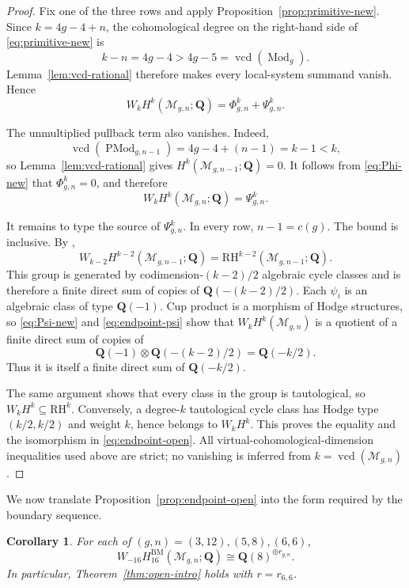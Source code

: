 \documentclass[12pt,reqno]{amsart}
\newcommand{\Q}{\mathbf{Q}}
\newcommand{\M}{\mathcal{M}}
\newcommand{\BM}{\mathrm{BM}}
\newcommand{\RH}{\mathrm{RH}}
\newcommand{\Mod}{\operatorname{Mod}}
\newcommand{\PMod}{\operatorname{PMod}}
\newcommand{\vcd}{\operatorname{vcd}}
\newtheorem{corollary}[theorem]{Corollary}
\theoremstyle{definition}
\theoremstyle{remark}
\begin{document}
\begin{proof}
Fix one of the three rows and apply
Proposition~\ref{prop:primitive-new}.  Since $k=4g-4+n$, the cohomological
degree on the right-hand side of \eqref{eq:primitive-new} is
\[
  k-n=4g-4>4g-5=\vcd(\Mod_g).
\]
Lemma~\ref{lem:vcd-rational} therefore makes every local-system summand
vanish.  Hence
\begin{equation}\label{eq:endpoint-phipsi}
  W_kH^k(\M_{g,n};\Q)=\Phi^k_{g,n}+\Psi^k_{g,n}.
\end{equation}

The unmultiplied pullback term also vanishes.  Indeed,
\[
 \vcd(\PMod_{g,n-1})
   =4g-4+(n-1)=k-1<k,
\]
so Lemma~\ref{lem:vcd-rational} gives
$H^k(\M_{g,n-1};\Q)=0$.  It follows from
\eqref{eq:Phi-new} that $\Phi^k_{g,n}=0$, and therefore
\begin{equation}\label{eq:endpoint-psi}
  W_kH^k(\M_{g,n};\Q)=\Psi^k_{g,n}.
\end{equation}

It remains to type the source of $\Psi^k_{g,n}$.  In every row,
$n-1=c(g)$.  The bound is inclusive.  By
\cite[Table~1, Lemma~4.3, and Proposition~4.5]{CLP},
\[
  W_{k-2}H^{k-2}(\M_{g,n-1};\Q)
   =\RH^{k-2}(\M_{g,n-1};\Q).
\]
This group is generated by codimension-$(k-2)/2$ algebraic cycle classes and
is therefore a finite direct sum of copies of $\Q(-(k-2)/2)$.  Each
$\psi_i$ is an algebraic class of type $\Q(-1)$.  Cup product is a morphism
of Hodge structures, so \eqref{eq:Psi-new} and
\eqref{eq:endpoint-psi} show that $W_kH^k(\M_{g,n})$ is a quotient of a
finite direct sum of copies of
\[
  \Q(-1)\otimes\Q(-(k-2)/2)=\Q(-k/2).
\]
Thus it is itself a finite direct sum of $\Q(-k/2)$.

The same argument shows that every class in the group is tautological, so
$W_kH^k\subseteq\RH^k$.  Conversely, a degree-$k$ tautological cycle class
has Hodge type $(k/2,k/2)$ and weight $k$, hence belongs to $W_kH^k$.
This proves the equality and the isomorphism in \eqref{eq:endpoint-open}.
All virtual-cohomological-dimension inequalities used above are strict; no
vanishing is inferred from $k=\vcd(\M_{g,n})$.
\end{proof}

We now translate Proposition~\ref{prop:endpoint-open} into the form required
by the boundary sequence.

\begin{corollary}\label{cor:endpoint-bm}
For each of $(g,n)=(3,12),(5,8),(6,6)$,
\begin{equation}\label{eq:endpoint-bm}
 W_{-16}H_{16}^{\BM}(\M_{g,n};\Q)
 \cong\Q(8)^{\oplus r_{g,n}}.
\end{equation}
In particular, Theorem~\ref{thm:open-intro} holds with
$r=r_{6,6}$.
\end{corollary}
\end{document}
